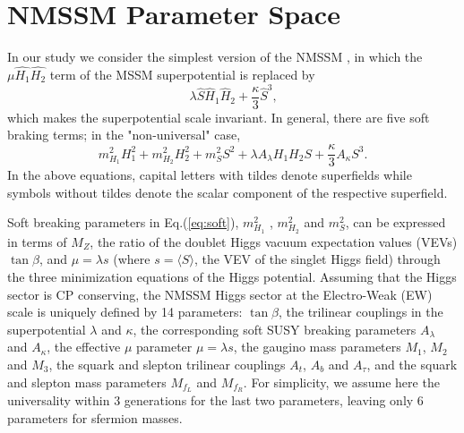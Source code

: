 \documentclass[aps,prl,nofootinbib,superscriptaddress]{revtex4}
\begin{document}
\section{NMSSM Parameter Space}

In our study we consider the simplest version of the NMSSM
\cite{Nilles:1982dy,Frere:1983ag,Ellis:1988er,%
Drees:1988fc,Ellwanger:1993hn,Ellwanger:1993xa,%
Elliott:1993bs,Pandita:1993tg,Ellwanger:1995ru,%
King:1995vk,Franke:1995tc,Ellwanger:1996gw},
in which the $\mu\widehat{H_1}\widehat{H_2}$ term of the 
MSSM superpotential is replaced by
\begin{equation}
\lambda  \widehat{S} \widehat{H}_1 \widehat{H}_2 + \frac{\kappa}{3}  \widehat{S}^3 \mbox{,}
\label{eq:superpot} 
\end{equation}
which makes the superpotential scale invariant.  In general, there are five
soft braking terms; in the "non-universal" case,
\begin{equation}
  m_{H_1}^2 H_1^2 + m_{H_2}^2 H_2^2  + m_{S}^2 S^2 
+ \lambda A_\lambda H_1 H_2 S +  \frac{\kappa}{3} A_\kappa S^3.
\label{eq:soft} 
\end{equation}
In the above equations, capital letters with tildes denote superfields
while symbols without tildes denote the scalar component of the respective
superfield.

Soft breaking parameters in Eq.(\ref{eq:soft}), $m_{H_1}^2$ , $m_{H_2}^2$  and $m_{S}^2$, 
can be expressed in terms of $M_Z$, the ratio  of the doublet Higgs vacuum expectation 
values (VEVs) $\tan\beta$, and $\mu = \lambda s$
(where $s=\langle S \rangle$, the VEV of the singlet Higgs field)
through the three minimization equations of the Higgs potential.
Assuming that the Higgs sector is CP conserving,
the NMSSM Higgs sector at the Electro-Weak (EW) scale is uniquely defined
by 14 parameters:
$\tan\beta$,
the trilinear couplings in the superpotential $\lambda$ and $\kappa$, the
corresponding soft SUSY breaking parameters $A_\lambda$ and $A_\kappa$,
the effective $\mu$ parameter $\mu = \lambda s$,
the gaugino mass parameters $M_1$, $M_2$ and $M_3$,
the squark and slepton trilinear couplings
$A_{t}$,  $A_{b}$ and  $A_\tau$,
and the squark and slepton mass parameters $M_{f_L}$ and $M_{f_R}$.
For simplicity, we assume here the
universality within 3 generations for the last two parameters, leaving
only 6 parameters for sfermion masses.
\end{document}
